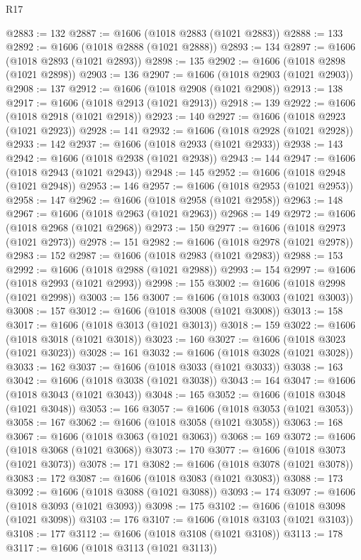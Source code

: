 \begin{lexlean}{R17}
\begin{coremodule}
{{{{{{{{{{{{{{{{{{{{{{{{{{{{{{{{{{{{{{{{{{{{{{{{{{{{{{{{{{{{{{{{{{{{{{{{{{{{{{{{{{{{{{{{{{{{{{{{{{{{{{{{{{{@2883 := 132
@2887 := @1606 (@1018 @2883 (@1021 @2883))
@2888 := 133
@2892 := @1606 (@1018 @2888 (@1021 @2888))
@2893 := 134
@2897 := @1606 (@1018 @2893 (@1021 @2893))
@2898 := 135
@2902 := @1606 (@1018 @2898 (@1021 @2898))
@2903 := 136
@2907 := @1606 (@1018 @2903 (@1021 @2903))
@2908 := 137
@2912 := @1606 (@1018 @2908 (@1021 @2908))
@2913 := 138
@2917 := @1606 (@1018 @2913 (@1021 @2913))
@2918 := 139
@2922 := @1606 (@1018 @2918 (@1021 @2918))
@2923 := 140
@2927 := @1606 (@1018 @2923 (@1021 @2923))
@2928 := 141
@2932 := @1606 (@1018 @2928 (@1021 @2928))
@2933 := 142
@2937 := @1606 (@1018 @2933 (@1021 @2933))
@2938 := 143
@2942 := @1606 (@1018 @2938 (@1021 @2938))
@2943 := 144
@2947 := @1606 (@1018 @2943 (@1021 @2943))
@2948 := 145
@2952 := @1606 (@1018 @2948 (@1021 @2948))
@2953 := 146
@2957 := @1606 (@1018 @2953 (@1021 @2953))
@2958 := 147
@2962 := @1606 (@1018 @2958 (@1021 @2958))
@2963 := 148
@2967 := @1606 (@1018 @2963 (@1021 @2963))
@2968 := 149
@2972 := @1606 (@1018 @2968 (@1021 @2968))
@2973 := 150
@2977 := @1606 (@1018 @2973 (@1021 @2973))
@2978 := 151
@2982 := @1606 (@1018 @2978 (@1021 @2978))
@2983 := 152
@2987 := @1606 (@1018 @2983 (@1021 @2983))
@2988 := 153
@2992 := @1606 (@1018 @2988 (@1021 @2988))
@2993 := 154
@2997 := @1606 (@1018 @2993 (@1021 @2993))
@2998 := 155
@3002 := @1606 (@1018 @2998 (@1021 @2998))
@3003 := 156
@3007 := @1606 (@1018 @3003 (@1021 @3003))
@3008 := 157
@3012 := @1606 (@1018 @3008 (@1021 @3008))
@3013 := 158
@3017 := @1606 (@1018 @3013 (@1021 @3013))
@3018 := 159
@3022 := @1606 (@1018 @3018 (@1021 @3018))
@3023 := 160
@3027 := @1606 (@1018 @3023 (@1021 @3023))
@3028 := 161
@3032 := @1606 (@1018 @3028 (@1021 @3028))
@3033 := 162
@3037 := @1606 (@1018 @3033 (@1021 @3033))
@3038 := 163
@3042 := @1606 (@1018 @3038 (@1021 @3038))
@3043 := 164
@3047 := @1606 (@1018 @3043 (@1021 @3043))
@3048 := 165
@3052 := @1606 (@1018 @3048 (@1021 @3048))
@3053 := 166
@3057 := @1606 (@1018 @3053 (@1021 @3053))
@3058 := 167
@3062 := @1606 (@1018 @3058 (@1021 @3058))
@3063 := 168
@3067 := @1606 (@1018 @3063 (@1021 @3063))
@3068 := 169
@3072 := @1606 (@1018 @3068 (@1021 @3068))
@3073 := 170
@3077 := @1606 (@1018 @3073 (@1021 @3073))
@3078 := 171
@3082 := @1606 (@1018 @3078 (@1021 @3078))
@3083 := 172
@3087 := @1606 (@1018 @3083 (@1021 @3083))
@3088 := 173
@3092 := @1606 (@1018 @3088 (@1021 @3088))
@3093 := 174
@3097 := @1606 (@1018 @3093 (@1021 @3093))
@3098 := 175
@3102 := @1606 (@1018 @3098 (@1021 @3098))
@3103 := 176
@3107 := @1606 (@1018 @3103 (@1021 @3103))
@3108 := 177
@3112 := @1606 (@1018 @3108 (@1021 @3108))
@3113 := 178
@3117 := @1606 (@1018 @3113 (@1021 @3113))
}}}}}}}}}}}}}}}}}}}}}}}}}}}}}}}}}}}}}}}}}}}}}}}}}}}}}}}}}}}}}}}}}}}}}}}}}}}}}}}}}}}}}}}}}}}}}}}}}}}}}}}}}}}
\end{coremodule}
\end{lexlean}
